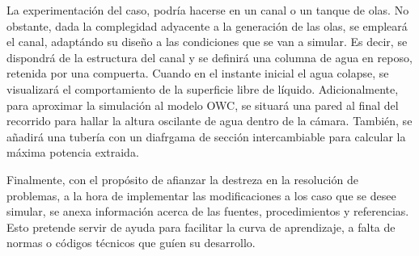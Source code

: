 La experimentación del caso, podría hacerse en un canal o un tanque de
olas. No obstante, dada la complegidad adyacente a la generación de las
olas, se empleará el canal, adaptándo su diseño a las condiciones que se
van a simular. Es decir, se dispondrá de la estructura del canal y se
definirá una columna de agua en reposo, retenida por una compuerta.
Cuando en el instante inicial el agua colapse, se visualizará el
comportamiento de la superficie libre de líquido. Adicionalmente, para
aproximar la simulación al modelo OWC, se situará una pared al final del
recorrido para hallar la altura oscilante de agua dentro de la cámara.
También, se añadirá una tubería con un diafrgama de sección
intercambiable para calcular la máxima potencia extraida.

Finalmente, con el propósito de afianzar la destreza en la resolución de
problemas, a la hora de implementar las modificaciones a los caso que se
desee simular, se anexa información acerca de las fuentes,
procedimientos y referencias. Esto pretende servir de ayuda para
facilitar la curva de aprendizaje, a falta de normas o códigos técnicos
que guíen su desarrollo.
